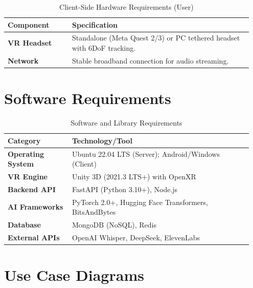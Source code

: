 \begin{table}[H]
\centering
\renewcommand{\arraystretch}{1.3}
\caption{Client-Side Hardware Requirements (User)}
\label{tab:hardware-client-req}
\begin{tabular}{|p{0.25\linewidth}|p{0.7\linewidth}|}
\hline
\rowcolor{gray!15} \textbf{Component} & \textbf{Specification} \\ \hline
\textbf{VR Headset} & Standalone (Meta Quest 2/3) or PC tethered headset with 6DoF tracking. \\ \hline
\textbf{Network} & Stable broadband connection for audio streaming. \\ \hline
\end{tabular}
\end{table}

\section{Software Requirements}
\begin{table}[H]
\centering
\renewcommand{\arraystretch}{1.3}
\caption{Software and Library Requirements}
\label{tab:software-req}
\begin{tabular}{|p{0.25\linewidth}|p{0.7\linewidth}|}
\hline
\rowcolor{gray!15} \textbf{Category} & \textbf{Technology/Tool} \\ \hline
\textbf{Operating System} & Ubuntu 22.04 LTS (Server); Android/Windows (Client) \\ \hline
\textbf{VR Engine} & Unity 3D (2021.3 LTS+) with OpenXR \\ \hline
\textbf{Backend API} & FastAPI (Python 3.10+), Node.js \\ \hline
\textbf{AI Frameworks} & PyTorch 2.0+, Hugging Face Transformers, BitsAndBytes \\ \hline
\textbf{Database} & MongoDB (NoSQL), Redis \\ \hline
\textbf{External APIs} & OpenAI Whisper, DeepSeek, ElevenLabs \\ \hline
\end{tabular}
\end{table}

\section{Use Case Diagrams}

